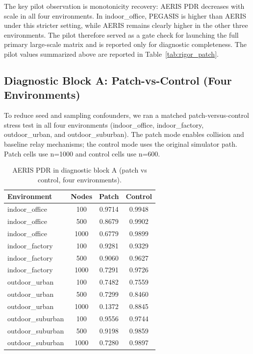 ﻿\documentclass[sensors,article,submit,moreauthors,pdftex]{Definitions/mdpi}
\begin{document}
The key pilot observation is monotonicity recovery: AERIS PDR decreases with scale in all four environments. In indoor\_office, PEGASIS is higher than AERIS under this stricter setting, while AERIS remains clearly higher in the other three environments. The pilot therefore served as a gate check for launching the full primary large-scale matrix and is reported only for diagnostic completeness.
The pilot values summarized above are reported in Table~\ref{tab:rigor_patch}.

\subsection{Diagnostic Block A: Patch-vs-Control (Four Environments)}
To reduce seed and sampling confounders, we ran a matched patch-versus-control stress test in all four environments (indoor\_office, indoor\_factory, outdoor\_urban, and outdoor\_suburban). The patch mode enables collision and baseline relay mechanisms; the control mode uses the original simulator path. Patch cells use n=1000 and control cells use n=600.

\begin{table}[H]
\caption{AERIS PDR in diagnostic block A (patch vs control, four environments).}
\label{tab:s9_patch_control}
\centering
\begin{tabular}{lccc}
\toprule
Environment & Nodes & Patch & Control \\
\midrule
indoor\_office & 100  & 0.9714 & 0.9948 \\
indoor\_office & 500  & 0.8679 & 0.9902 \\
indoor\_office & 1000 & 0.6779 & 0.9899 \\
indoor\_factory & 100  & 0.9281 & 0.9329 \\
indoor\_factory & 500  & 0.9060 & 0.9627 \\
indoor\_factory & 1000 & 0.7291 & 0.9726 \\
outdoor\_urban & 100  & 0.7482 & 0.7559 \\
outdoor\_urban & 500  & 0.7299 & 0.8460 \\
outdoor\_urban & 1000 & 0.1372 & 0.8845 \\
outdoor\_suburban & 100  & 0.9556 & 0.9744 \\
outdoor\_suburban & 500  & 0.9198 & 0.9859 \\
outdoor\_suburban & 1000 & 0.7280 & 0.9897 \\
\bottomrule
\end{tabular}
\end{table}
\end{document}
